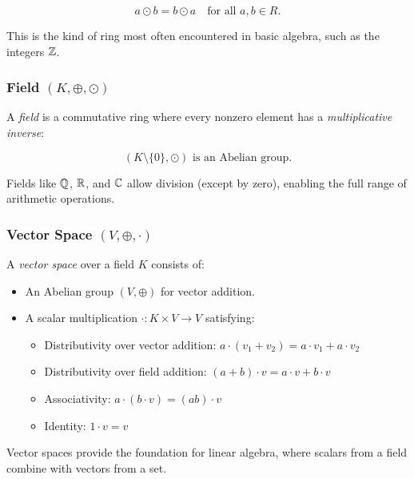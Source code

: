 \[
    a \odot b = b \odot a \quad \text{for all } a, b \in R.
\]

This is the kind of ring most often encountered in basic algebra, such as the integers \(\mathbb{Z}\).

\subsubsection{Field \texorpdfstring{\((K, \oplus, \odot)\)}{}}
A \emph{field} is a commutative ring where every nonzero element has a \emph{multiplicative inverse}:

\[
    (K \setminus \{0\}, \odot) \text{ is an Abelian group}.
\]

Fields like \(\mathbb{Q}\), \(\mathbb{R}\), and \(\mathbb{C}\) allow division (except by zero), enabling the full range of arithmetic operations.

\subsubsection{Vector Space \texorpdfstring{\((V, \oplus, \cdot)\)}{}}

A \emph{vector space} over a field \(K\) consists of:

\begin{itemize}

    \item An Abelian group \((V, \oplus)\) for vector addition.

    \item A scalar multiplication \(\cdot: K \times V \to V\) satisfying:

    \begin{itemize}

        \item Distributivity over vector addition: \(a \cdot (v_1 + v_2) = a \cdot v_1 + a \cdot v_2\)
    
        \item Distributivity over field addition: \((a + b) \cdot v = a \cdot v + b \cdot v\)

        \item Associativity: \(a \cdot (b \cdot v) = (ab) \cdot v\)
    
        \item Identity: \(1 \cdot v = v\)

  \end{itemize}

\end{itemize}

Vector spaces provide the foundation for linear algebra, where scalars from a field combine with vectors from a set.

